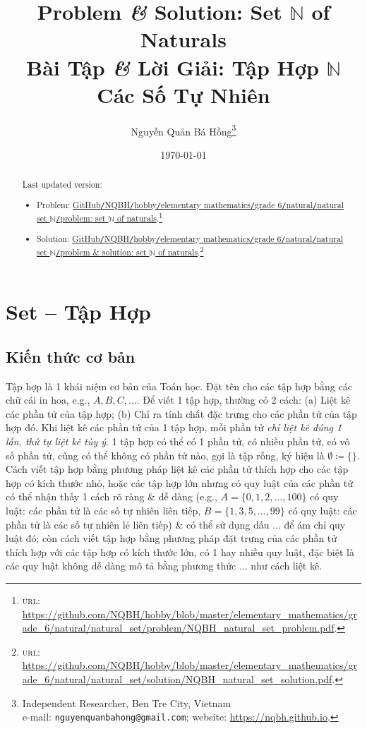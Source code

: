 \documentclass{article}
\title{Problem {\it\&} Solution: Set $\mathbb{N}$ of Naturals\\Bài Tập {\it\&} Lời Giải: Tập Hợp $\mathbb{N}$ Các Số Tự Nhiên}
\author{Nguyễn Quản Bá Hồng\footnote{Independent Researcher, Ben Tre City, Vietnam\\e-mail: \texttt{nguyenquanbahong@gmail.com}; website: \url{https://nqbh.github.io}.}}
\date{\today}
\begin{document}
\maketitle
\begin{abstract}
	Last updated version:
	\begin{itemize}
		\item Problem: \href{https://github.com/NQBH/hobby/blob/master/elementary_mathematics/grade_6/natural/natural_set/problem/NQBH_natural_set_problem.pdf}{GitHub{\tt/}NQBH{\tt/}hobby{\tt/}elementary mathematics{\tt/}grade 6{\tt/}natural{\tt/}natural set $\mathbb{N}${\tt/}problem: set $\mathbb{N}$ of naturals}.\footnote{\textsc{url}: \url{https://github.com/NQBH/hobby/blob/master/elementary_mathematics/grade_6/natural/natural_set/problem/NQBH_natural_set_problem.pdf}.}
		\item Solution: \href{https://github.com/NQBH/hobby/blob/master/elementary_mathematics/grade_6/natural/natural_set/solution/NQBH_natural_set_solution.pdf}{GitHub{\tt/}NQBH{\tt/}hobby{\tt/}elementary mathematics{\tt/}grade 6{\tt/}natural{\tt/}natural set $\mathbb{N}${\tt/}problem \& solution: set $\mathbb{N}$ of naturals}.\footnote{\textsc{url}: \url{https://github.com/NQBH/hobby/blob/master/elementary_mathematics/grade_6/natural/natural_set/solution/NQBH_natural_set_solution.pdf}.}
	\end{itemize}
	
	
	
	
\end{abstract}


\section{Set -- Tập Hợp}

\subsection{Kiến thức cơ bản}
 Tập hợp là 1 khái niệm cơ bản của Toán học. Đặt tên cho các tập hợp bằng các chữ cái in hoa, e.g., $A,B,C,\ldots$.  Để viết 1 tập hợp, thường có 2 cách: (a) Liệt kê các phần tử của tập hợp; (b) Chỉ ra tính chất đặc trưng cho các phần tử của tập hợp đó.  Khi liệt kê các phần tử của 1 tập hợp, mỗi phần tử \textit{chỉ liệt kê đúng 1 lần, thứ tự liệt kê tùy ý}.  1 tập hợp có thể có 1 phần tử, có nhiều phần tử, có vô số phần tử, cũng có thể không có phần tử nào, gọi là tập rỗng, ký hiệu là $\emptyset\coloneqq\{\}$.  Cách viết tập hợp bằng phương pháp liệt kê các phần tử thích hợp cho các tập hợp có kích thước nhỏ, hoặc các tập hợp lớn nhưng có quy luật của các phần tử có thể nhận thấy 1 cách rõ ràng \& dễ dàng (e.g., $A = \{0,1,2,\ldots,100\}$ có quy luật: các phần tử là các số tự nhiên liên tiếp, $B = \{1,3,5,\ldots,99\}$ có quy luật: các phần tử là các số tự nhiên lẻ liên tiếp) \& có thể sử dụng dấu $\ldots$ để ám chỉ quy luật đó; còn cách viết tập hợp bằng phương pháp đặt trưng của các phần tử thích hợp với các tập hợp có kích thước lớn, có 1 hay nhiều quy luật, đặc biệt là các quy luật không dễ dàng mô tả bằng phương thức $\ldots$ như cách liệt kê.
\end{document}
